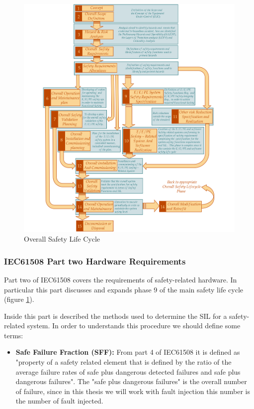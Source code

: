 {{{{			   \begin{figure}[H]
    				\centering
    				\includegraphics[scale=0.2,center]{./images/SafetyLifeCycle.png}
    				\caption{Overall Safety Life Cycle}
			    	\label{fig:FirstPartOfSafetyLifeCycle}
			    \end{figure} 
		    
		    }
		    \subsubsection{IEC61508 Part two Hardware Requirements} {
		        Part two of IEC61508 covers the requirements of safety-related hardware. In particular this part discusses and expands phase 9 of the main safety life cycle (figure \ref{fig:FirstPartOfSafetyLifeCycle}).
		        
		        Inside this part is described the methods used to determine the SIL for a safety-related system. In order to understands this procedure we should define some terms:
		        \begin{itemize}
		            \item \textbf{Safe Failure Fraction (SFF):} From part 4 of IEC61508 it is defined as "property of a safety related element that is defined by the ratio of the average failure rates of safe plus dangerous detected failures and safe plus dangerous failures". The "safe plus dangerous failures" is the overall number of failure, since in this thesis we will work with fault injection this number is the number of fault injected.
		            

\end{itemize}}}}}
